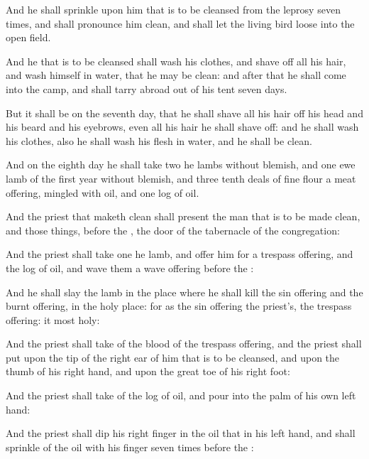 {And he shall
sprinkle upon him that is to be
cleansed from the
leprosy
seven
times, and shall pronounce him
clean, and shall let the
living
bird
loose into the
open
field.

And he that is to be
cleansed shall
wash his
clothes, and
shave off all his
hair, and
wash himself in
water, that he may be
clean: and
after that he shall
come into the
camp, and shall
tarry
abroad out of his
tent
seven
days.

But it shall be on the
seventh
day, that he shall
shave all his
hair off his
head and his
beard and his
eyebrows, even all his
hair he shall
shave off: and he shall
wash his
clothes, also he shall
wash his
flesh in
water, and he shall be
clean.


\par }{\PP {}And on the
eighth
day he shall
take
two he
lambs without
blemish, and
one ewe
lamb of the
first
year without
blemish, and
three tenth
deals of fine
flour
{} a meat
offering,
mingled with
oil, and
one
log of
oil.

And the
priest that maketh
{}
clean shall
present the
man that is to be made
clean, and those things,
before the
{},
{} the
door of the
tabernacle of the
congregation:

And the
priest shall
take
one he
lamb, and
offer him for a trespass
offering, and the
log of
oil, and
wave them
{} a wave
offering
before the
{}:

And he shall
slay the
lamb in the
place where he shall
kill the sin
offering and the burnt
offering, in the
holy
place: for as the sin
offering
{} the
priest’s,
{} the trespass
offering: it
{}
most
holy:

And the
priest shall
take
{} of the
blood of the trespass
offering, and the
priest shall
put
{} upon the
tip of the
right
ear of him that is to be
cleansed, and upon the
thumb of his
right
hand, and upon the great
toe of his
right
foot:

And the
priest shall
take
{} of the
log of
oil, and
pour
{} into the
palm of his
own left
hand:

And the
priest shall
dip his
right
finger in the
oil that
{} in his
left
hand, and shall
sprinkle of the
oil with his
finger
seven
times
before the
{}:

}
